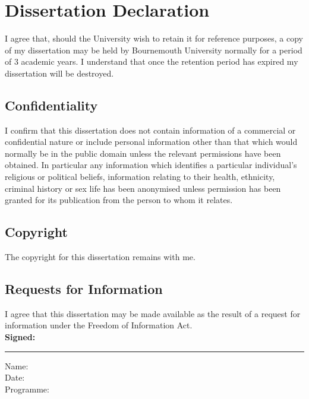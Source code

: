 \chapter*{Dissertation Declaration}
{\linespread{1.0} %
I agree that, should the University wish to retain it for reference purposes, a copy of my dissertation may be held by Bournemouth University normally for a period of 3 academic years. I understand that once the retention period has expired my dissertation will be destroyed.

\section*{Confidentiality}
I confirm that this dissertation does not contain information of a commercial or confidential nature or include personal information other than that which would normally be in the public domain unless the relevant permissions have been obtained. In particular any information which identifies a particular individual's religious or political beliefs, information relating to their health, ethnicity, criminal history or sex life has been anonymised unless permission has been granted for its publication from the person to whom it relates.

\section*{Copyright}
The copyright for this dissertation remains with me.
 
\section*{Requests for Information}
I agree that this dissertation may be made available as the result of a request for information under the Freedom of Information Act.
\\ \newline \newline
\textbf{Signed:}
\hrule width 0.5\textwidth
\vspace{6pt}
\noindent
Name: 
\\
Date:
\\
Programme: 
}